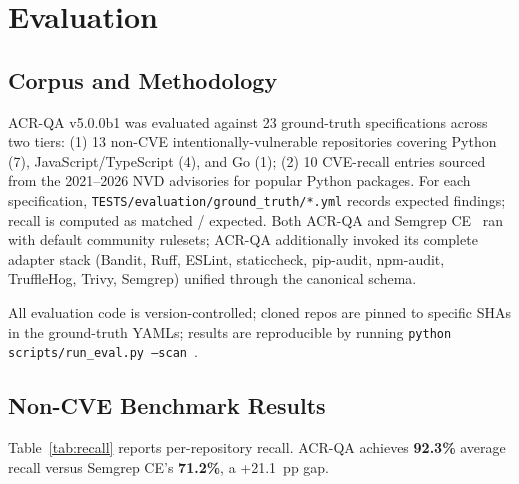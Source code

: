 \documentclass[conference]{IEEEtran}
\begin{document}
\section{Evaluation}
\label{sec:eval}

\subsection{Corpus and Methodology}

ACR-QA v5.0.0b1 was evaluated against 23 ground-truth specifications across two tiers: (1) 13 non-CVE intentionally-vulnerable repositories covering Python (7), JavaScript/TypeScript (4), and Go (1); (2) 10 CVE-recall entries sourced from the 2021--2026 NVD advisories for popular Python packages. For each specification, \texttt{TESTS/evaluation/ground\_truth/*.yml} records expected findings; recall is computed as matched / expected. Both ACR-QA and Semgrep CE~\cite{semgrep_tool} ran with default community rulesets; ACR-QA additionally invoked its complete adapter stack (Bandit, Ruff, ESLint, staticcheck, pip-audit, npm-audit, TruffleHog, Trivy, Semgrep) unified through the canonical schema.

All evaluation code is version-controlled; cloned repos are pinned to specific SHAs in the ground-truth YAMLs; results are reproducible by running \texttt{python scripts/run\_eval.py --scan}~\cite{ko2015practical}.

\subsection{Non-CVE Benchmark Results}

Table~\ref{tab:recall} reports per-repository recall. ACR-QA achieves \textbf{92.3\%} average recall versus Semgrep CE's \textbf{71.2\%}, a +21.1~pp gap.
\end{document}
